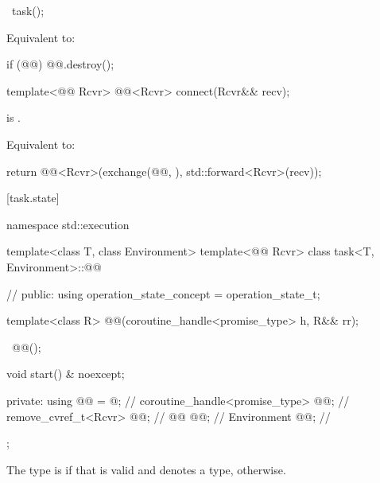%
\begin{itemdecl}
~task();
\end{itemdecl}
\begin{itemdescr}
\pnum
\effects
Equivalent to:
\begin{codeblock}
if (@@)
  @@.destroy();
\end{codeblock}
\end{itemdescr}

%
\begin{itemdecl}
template<@@ Rcvr>
  @@<Rcvr> connect(Rcvr&& recv);
\end{itemdecl}
\begin{itemdescr}
\pnum
\expects
{} is .

\pnum
\effects
Equivalent to:
\begin{codeblock}
return @@<Rcvr>(exchange(@@, {}), std::forward<Rcvr>(recv));
\end{codeblock}
\end{itemdescr}

[task.state]{}

\begin{codeblock}
namespace std::execution {
  template<class T, class Environment>
  template<@@ Rcvr>
  class task<T, Environment>::@@ {           // \expos
  public:
    using operation_state_concept = operation_state_t;

    template<class R>
      @@(coroutine_handle<promise_type> h, R&& rr);

    ~@@();

    void start() & noexcept;

  private:
    using @@ = @\seebelownc@;                // \expos
    coroutine_handle<promise_type> @@;      // \expos
    remove_cvref_t<Rcvr>           @@;        // \expos
    @@                      @@;     // \expos
    Environment                    @@; // \expos
  };
}
\end{codeblock}

\pnum
The type  is  if that
 is valid and denotes a type,  otherwise.

